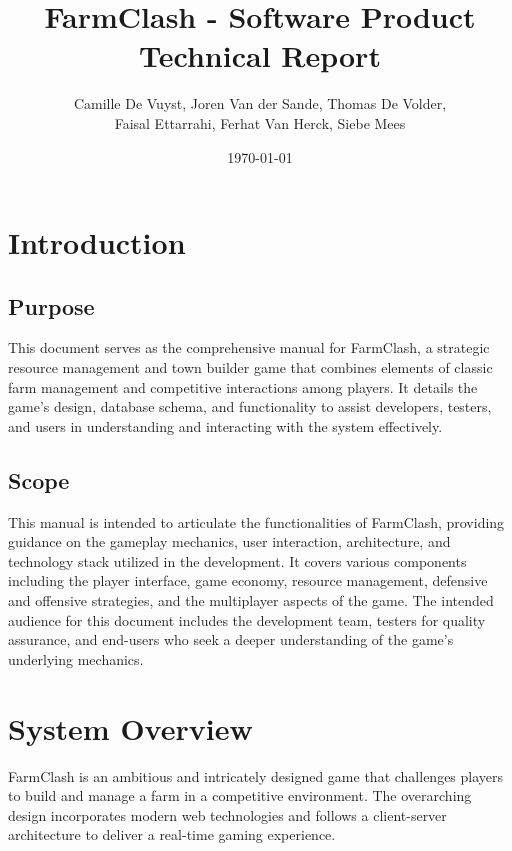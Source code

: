 \documentclass[12pt]{article}
\title{FarmClash - Software Product Technical Report}
\author{Camille De Vuyst, Joren Van der Sande, Thomas De Volder,\\ Faisal Ettarrahi, Ferhat Van Herck, Siebe Mees}
\date{\today}
\begin{document}
\maketitle
\tableofcontents
\newpage

\section{Introduction}
\subsection{Purpose}
This document serves as the comprehensive manual for FarmClash, a strategic resource management and town builder game that combines elements of classic farm management and competitive interactions among players. It details the game’s design, database schema, and functionality to assist developers, testers, and users in understanding and interacting with the system effectively.

\subsection{Scope}
This manual is intended to articulate the functionalities of FarmClash, providing guidance on the gameplay mechanics, user interaction, architecture, and technology stack utilized in the development. It covers various components including the player interface, game economy, resource management, defensive and offensive strategies, and the multiplayer aspects of the game. The intended audience for this document includes the development team, testers for quality assurance, and end-users who seek a deeper understanding of the game’s underlying mechanics.

\section{System Overview}
FarmClash is an ambitious and intricately designed game that challenges players to build and manage a farm in a competitive environment. The overarching design incorporates modern web technologies and follows a client-server architecture to deliver a real-time gaming experience.
\end{document}
